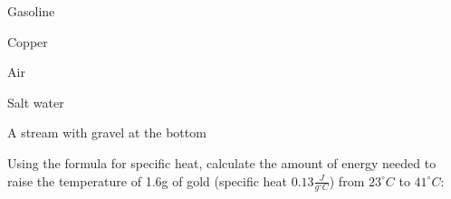 \documentclass[11pt]{exam}
\begin{document}
\begin{questions}
Gasoline
\vspace{5mm}

Copper
\vspace{5mm}

Air
\vspace{5mm}

Salt water
\vspace{5mm}

A stream with gravel at the bottom
\vspace{5mm}

\question Using the formula for specific heat, calculate the amount of energy needed to raise the temperature of 1.6g of gold (specific heat $0.13 \frac{J}{g^{\circ}C}$) from $23 ^{\circ}C$ to $41 ^{\circ}C$:
\vspace{5mm}

\end{questions}
\end{document}

